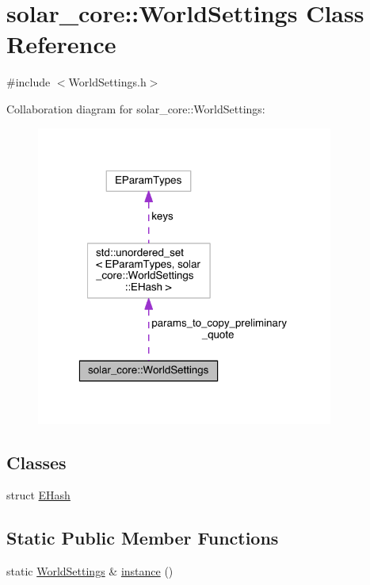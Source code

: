 \hypertarget{classsolar__core_1_1_world_settings}{}\section{solar\+\_\+core\+:\+:World\+Settings Class Reference}
\label{classsolar__core_1_1_world_settings}


{\ttfamily \#include $<$World\+Settings.\+h$>$}



Collaboration diagram for solar\+\_\+core\+:\+:World\+Settings\+:
\nopagebreak
\begin{figure}[H]
\begin{center}
\leavevmode
\includegraphics[width=277pt]{classsolar__core_1_1_world_settings__coll__graph}
\end{center}
\end{figure}
\subsection*{Classes}
\begin{DoxyCompactItemize}
\item 
struct \hyperlink{structsolar__core_1_1_world_settings_1_1_e_hash}{E\+Hash}
\end{DoxyCompactItemize}
\subsection*{Static Public Member Functions}
\begin{DoxyCompactItemize}
\item 
static \hyperlink{classsolar__core_1_1_world_settings}{World\+Settings} \& \hyperlink{classsolar__core_1_1_world_settings_a719e11b52a0e087f8c0dd11d9f65da88}{instance} ()
\end{DoxyCompactItemize}
